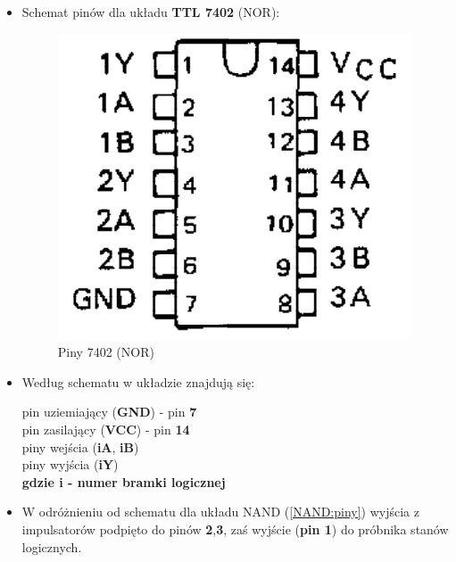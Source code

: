\begin{itemize}
    \item Schemat pinów dla układu \textbf{TTL 7402} (NOR):
        \begin{figure}[H]
            \centering
            \includegraphics[scale=0.25]{img/schemes/NOR_7402_pins.png}
            \caption{Piny 7402 (NOR)}
            \label{NOR:piny}
        \end{figure}
    \item Według schematu w układzie znajdują się: 
        \begin{center}
            pin uziemiający (\textbf{GND}) - pin \textbf{7} \\
            pin zasilający (\textbf{VCC}) - pin \textbf{14} \\
            piny wejścia (\textbf{iA}, \textbf{iB}) \\
            piny wyjścia (\textbf{iY}) \\
            \textbf{gdzie i - numer bramki logicznej}
        \end{center}
    \item W odróżnieniu od schematu dla układu NAND (\ref{NAND:piny}) wyjścia z impulsatorów podpięto do pinów \textbf{2},\textbf{3}, zaś wyjście (\textbf{pin 1}) do próbnika stanów logicznych.
        \begin{figure}[H]
            \centering
                \begin{subfigure}[h]{0.4\textwidth}

\end{subfigure}
\end{figure}
\end{itemize}
